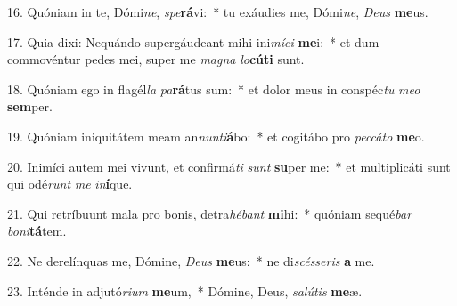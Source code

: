 16. Quóniam in te, Dómi\textit{ne}, \textit{spe}\textbf{rá}vi:~*  tu exáudies me, Dómi\textit{ne}, \textit{De}\textit{us} \textbf{me}us.\

17. Quia dixi: Nequándo supergáudeant mihi ini\textit{mí}\textit{ci} \textbf{me}i:~*  et dum commovéntur pedes mei, super me \textit{ma}\textit{gna} \textit{lo}\textbf{cú}\textbf{ti} sunt.\

18. Quóniam ego in flagél\textit{la} \textit{pa}\textbf{rá}tus sum:~*  et dolor meus in conspéc\textit{tu} \textit{me}\textit{o} \textbf{sem}per.\

19. Quóniam iniquitátem meam an\textit{nun}\textit{ti}\textbf{á}bo:~*  et cogitábo pro \textit{pec}\textit{cá}\textit{to} \textbf{me}o.\

20. Inimíci autem mei vivunt, et confirmá\textit{ti} \textit{sunt} \textbf{su}per me:~*  et multiplicáti sunt qui odé\textit{runt} \textit{me} \textit{in}\textbf{í}que.\

21. Qui retríbuunt mala pro bonis, detra\textit{hé}\textit{bant} \textbf{mi}hi:~*  quóniam sequé\textit{bar} \textit{bo}\textit{ni}\textbf{tá}tem.\

22. Ne derelínquas me, Dómine, \textit{De}\textit{us} \textbf{me}us:~*  ne di\textit{scés}\textit{se}\textit{ris} \textbf{a} me.\

23. Inténde in adjutó\textit{ri}\textit{um} \textbf{me}um,~*  Dómine, Deus, \textit{sa}\textit{lú}\textit{tis} \textbf{me}æ.\

